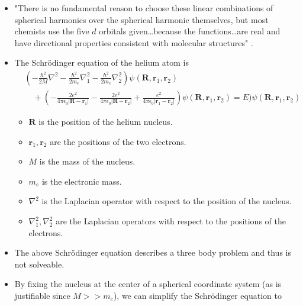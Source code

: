 \documentclass[../notes.tex]{subfiles}
\begin{document}
\begin{itemize}
\begin{table}[h!]
        \caption{The first few complete real hydrogenlike atomic wave functions.}
        \label{tab:hydrogenRealWavefunctions}
    \end{table}
    \item "There is no fundamental reason to choose these linear combinations of spherical harmonics over the spherical harmonic themselves, but most chemists use the five $d$ orbitals given\dots because the functions\dots are real and have directional properties consistent with molecular structures" \parencite[218]{bib:McQuarrieSimon}.
    \item The Schr\"{o}dinger equation of the helium atom is
    \begin{equation*}
        \begin{split}
            &\left( -\frac{\hbar^2}{2M}\nabla^2-\frac{\hbar^2}{2m_e}\nabla_1^2-\frac{\hbar^2}{2m_e}\nabla_2^2 \right)\psi(\mathbf{R},\mathbf{r}_1,\mathbf{r}_2)\\
            &\quad +\left( -\frac{2e^2}{4\pi\epsilon_0|\mathbf{R}-\mathbf{r}_1|}-\frac{2e^2}{4\pi\epsilon_0|\mathbf{R}-\mathbf{r}_2|}+\frac{e^2}{4\pi\epsilon_0|\mathbf{r}_1-\mathbf{r}_2|} \right)\psi(\mathbf{R},\mathbf{r}_1,\mathbf{r}_2) = E)\psi(\mathbf{R},\mathbf{r}_1,\mathbf{r}_2)
        \end{split}
    \end{equation*}
    \begin{itemize}
        \item $\mathbf{R}$ is the position of the helium nucleus.
        \item $\mathbf{r}_1,\mathbf{r}_2$ are the positions of the two electrons.
        \item $M$ is the mass of the nucleus.
        \item $m_e$ is the electronic mass.
        \item $\nabla^2$ is the Laplacian operator with respect to the position of the nucleus.
        \item $\nabla_1^2,\nabla_2^2$ are the Laplacian operators with respect to the positions of the electrons.
    \end{itemize}
    \item The above Schr\"{o}dinger equation describes a three body problem and thus is not solveable.
    \item By fixing the nucleus at the center of a spherical coordinate system (as is justifiable since $M>>m_e$), we can simplify the Schr\"{o}dinger equation to
    \begin{equation*}

\end{equation*}
\end{itemize}
\end{document}
